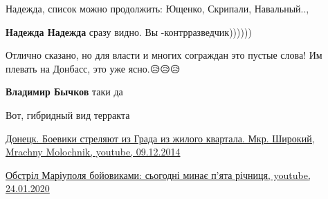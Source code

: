 \begin{itemize}
\begin{itemize}
Надежда, список можно продолжить: Ющенко, Скрипали, Навальный..,

 
\textbf{Надежда Надежда} сразу видно. Вы -контрразведчик))))))
\end{itemize}

 

Отлично сказано, но для власти и многих сограждан это пустые слова! Им плевать
на Донбасс, это уже ясно.😥😥😥

\begin{itemize}
 
\textbf{Владимир Бычков} таки да
\end{itemize}

 
Вот, гибридный вид терракта

\href{https://youtu.be/N1zbZZii5rs}{%
Донецк. Боевики стреляют из Града из жилого квартала. Мкр. Широкий, %
Mrachny Molochnik, %
youtube, 09.12.2014%
}

 
\href{https://youtu.be/uC4ITLdtVsI}{%
Обстріл Маріуполя бойовиками: сьогодні минає п’ята річниця, youtube, 24.01.2020%
}

\begin{itemize}
 

\end{itemize}
\end{itemize}
